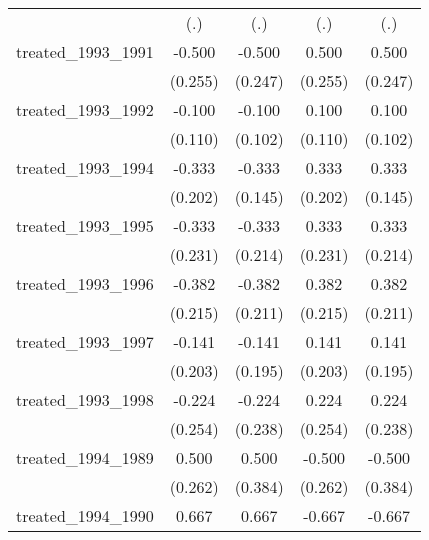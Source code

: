 {\begin{tabular}{l*{4}{c}}
            &         (.)         &         (.)         &         (.)         &         (.)         \\
[1em]
treated\_1993\_1991&      -0.500\sym{*}  &      -0.500\sym{*}  &       0.500\sym{*}  &       0.500\sym{*}  \\
            &     (0.255)         &     (0.247)         &     (0.255)         &     (0.247)         \\
[1em]
treated\_1993\_1992&      -0.100         &      -0.100         &       0.100         &       0.100         \\
            &     (0.110)         &     (0.102)         &     (0.110)         &     (0.102)         \\
[1em]
treated\_1993\_1994&      -0.333         &      -0.333\sym{*}  &       0.333         &       0.333\sym{*}  \\
            &     (0.202)         &     (0.145)         &     (0.202)         &     (0.145)         \\
[1em]
treated\_1993\_1995&      -0.333         &      -0.333         &       0.333         &       0.333         \\
            &     (0.231)         &     (0.214)         &     (0.231)         &     (0.214)         \\
[1em]
treated\_1993\_1996&      -0.382         &      -0.382         &       0.382         &       0.382         \\
            &     (0.215)         &     (0.211)         &     (0.215)         &     (0.211)         \\
[1em]
treated\_1993\_1997&      -0.141         &      -0.141         &       0.141         &       0.141         \\
            &     (0.203)         &     (0.195)         &     (0.203)         &     (0.195)         \\
[1em]
treated\_1993\_1998&      -0.224         &      -0.224         &       0.224         &       0.224         \\
            &     (0.254)         &     (0.238)         &     (0.254)         &     (0.238)         \\
[1em]
treated\_1994\_1989&       0.500         &       0.500         &      -0.500         &      -0.500         \\
            &     (0.262)         &     (0.384)         &     (0.262)         &     (0.384)         \\
[1em]
treated\_1994\_1990&       0.667\sym{*}  &       0.667\sym{*}  &      -0.667\sym{*}  &      -0.667\sym{*}  \\

\end{tabular}}
